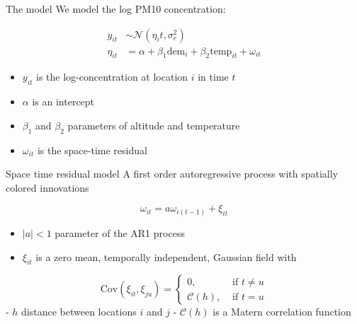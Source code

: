 \documentclass[
  ignorenonframetext,
]{beamer}
\begin{document}
\begin{frame}{The model}
\protect\hypertarget{the-model-1}{}
We model the log PM10 concentration:

\[
\begin{aligned}
y_{it}&\sim\mathcal{N}(\eta_it, \sigma^2_e)\\
\eta_{it}& = \alpha + \beta_1\text{dem}_i + \beta_2\text{temp}_{it} + \omega_{it}
\end{aligned}
\]

\begin{itemize}
\item
  \(y_{it}\) is the log-concentration at location \(i\) in time \(t\)
\item
  \(\alpha\) is an intercept
\item
  \(\beta_1\) and \(\beta_2\) parameters of altitude and temperature
\item
  \(\omega_{it}\) is the space-time residual
\end{itemize}
\end{frame}

\begin{frame}{Space time residual model}
\protect\hypertarget{space-time-residual-model}{}
A first order autoregressive process with spatially colored innovations

\[
\omega_{it}  = a \omega_{i(t-1)}+\xi_{it}
\]

\begin{itemize}
\item
  \(|a|<1\) parameter of the AR1 process
\item
  \(\xi_{it}\) is a zero mean, temporally independent, Gaussian field
  with
\end{itemize}

\[
\text{Cov}(\xi_{it},\xi_{ju})  =
\begin{cases}
 0 ,& \text{ if } t\neq u \\
 \mathcal{C}(h),&  \text{ if } t= u
 \end{cases}
\] - \(h\) distance between locations \(i\) and \(j\) -
\(\mathcal{C}(h)\) is a Matern correlation function
\end{frame}
\end{document}
